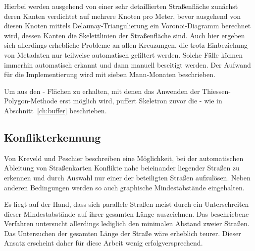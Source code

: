 \documentclass[../main/thesis.tex]{subfiles}
\begin{document}
Hierbei werden ausgehend von einer sehr detaillierten Straßenfläche zunächst deren Kanten verdichtet auf mehrere Knoten pro Meter, bevor ausgehend von diesen Knoten mittels Delaunay-Triangulierung ein Voronoi-Diagramm berechnet wird, dessen Kanten die Skelettlinien der Straßenfläche sind.
Auch hier ergeben sich allerdings erhebliche Probleme an allen Kreuzungen, die trotz Einbeziehung von Metadaten nur teilweise automatisch gefiltert werden.
Solche Fälle können immerhin automatisch erkannt und dann manuell beseitigt werden.
Der Aufwand für die Implementierung wird mit sieben Mann-Monaten beschrieben. 

Um aus den \osm- Flächen zu erhalten, mit denen das Anwenden der Thiessen-Polygon-Methode erst möglich wird, puffert Skeletron zuvor die \osm- wie in Abschnitt~\ref{ch:buffer} beschrieben. 


\subsection{Konflikterkennung}
\label{ch:conflict-detection}


Von Kreveld und Peschier beschreiben eine Möglichkeit, bei der automatischen Ableitung von Straßenkarten Konflikte nahe beieinander liegender Straßen zu erkennen und durch Auswahl nur einer der beteiligten Straßen aufzulösen.
Neben anderen Bedingungen werden so auch graphische Mindestabstände eingehalten. 

Es liegt auf der Hand, dass sich parallele Straßen meist durch ein Unterschreiten dieser Mindestabstände auf ihrer gesamten Länge auszeichnen.
Das beschriebene Verfahren untersucht allerdings lediglich den minimalen Abstand zweier Straßen.
Das Untersuchen der gesamten Länge der Straße wäre erheblich teurer. 
Dieser Ansatz erscheint daher für diese Arbeit wenig erfolgversprechend.

\end{document}
